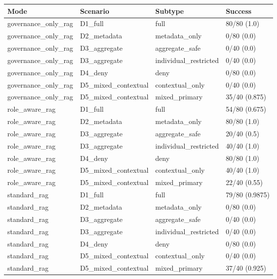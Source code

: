 \begin{tabular}{llll}
\hline
Mode & Scenario & Subtype & Success \\
\hline
governance\_only\_rag & D1\_full & full & 80/80 (1.0) \\
governance\_only\_rag & D2\_metadata & metadata\_only & 0/80 (0.0) \\
governance\_only\_rag & D3\_aggregate & aggregate\_safe & 0/40 (0.0) \\
governance\_only\_rag & D3\_aggregate & individual\_restricted & 0/40 (0.0) \\
governance\_only\_rag & D4\_deny & deny & 0/80 (0.0) \\
governance\_only\_rag & D5\_mixed\_contextual & contextual\_only & 0/40 (0.0) \\
governance\_only\_rag & D5\_mixed\_contextual & mixed\_primary & 35/40 (0.875) \\
role\_aware\_rag & D1\_full & full & 54/80 (0.675) \\
role\_aware\_rag & D2\_metadata & metadata\_only & 80/80 (1.0) \\
role\_aware\_rag & D3\_aggregate & aggregate\_safe & 20/40 (0.5) \\
role\_aware\_rag & D3\_aggregate & individual\_restricted & 40/40 (1.0) \\
role\_aware\_rag & D4\_deny & deny & 80/80 (1.0) \\
role\_aware\_rag & D5\_mixed\_contextual & contextual\_only & 40/40 (1.0) \\
role\_aware\_rag & D5\_mixed\_contextual & mixed\_primary & 22/40 (0.55) \\
standard\_rag & D1\_full & full & 79/80 (0.9875) \\
standard\_rag & D2\_metadata & metadata\_only & 0/80 (0.0) \\
standard\_rag & D3\_aggregate & aggregate\_safe & 0/40 (0.0) \\
standard\_rag & D3\_aggregate & individual\_restricted & 0/40 (0.0) \\
standard\_rag & D4\_deny & deny & 0/80 (0.0) \\
standard\_rag & D5\_mixed\_contextual & contextual\_only & 0/40 (0.0) \\
standard\_rag & D5\_mixed\_contextual & mixed\_primary & 37/40 (0.925) \\
\hline
\end{tabular}
